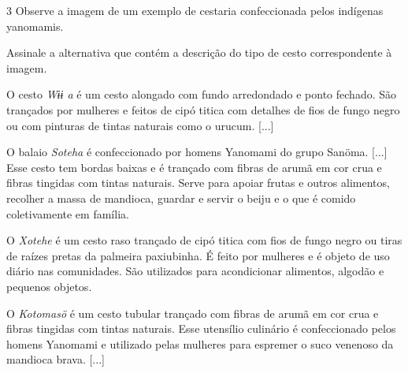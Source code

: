 \begin{escolha}

\num{3}  Observe a imagem de um exemplo de cestaria confeccionada pelos
  indígenas yanomamis.


Assinale a alternativa que contém a descrição do tipo de cesto correspondente à imagem.

\begin{escolha}
\item
  O cesto \emph{Wɨɨ a} é um cesto alongado com fundo arredondado e ponto
  fechado. São trançados por mulheres e feitos de cipó titica com
  detalhes de fios de fungo negro ou com pinturas de tintas naturais
  como o urucum. {[}...{]}
\item
  O balaio \emph{Soteha} é confeccionado por homens Yanomami do grupo
  Sanöma. {[}...{]} Esse cesto tem bordas baixas e é trançado com fibras
  de arumã em cor crua e fibras tingidas com tintas naturais. Serve para
  apoiar frutas e outros alimentos, recolher a massa de mandioca,
  guardar e servir o beiju e o que é comido coletivamente em família.
\item
  O \emph{Xotehe} é um cesto raso trançado de cipó titica com fios de
  fungo negro ou tiras de raízes pretas da palmeira paxiubinha. É feito
  por mulheres e é objeto de uso diário nas comunidades. São utilizados
  para acondicionar alimentos, algodão e pequenos objetos.
\item
  O \emph{Kotomasö} é um cesto tubular trançado com fibras de arumã em
  cor crua e fibras tingidas com tintas naturais. Esse utensílio
  culinário é confeccionado pelos homens Yanomami e utilizado pelas
  mulheres para espremer o suco venenoso da mandioca brava. {[}...{]}
\end{escolha}


\end{escolha}
